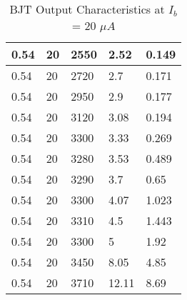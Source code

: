 \documentclass{scrartcl}
\newcommand{\1}{\mathbbm{1}}
\begin{document}
\begin{table}[!ht]
\begin{tabular}{|l|l|l|l|l|}
            0.54 & 20 & 2550 & 2.52 & 0.149 \\ \hline
            0.54 & 20 & 2720 & 2.7 & 0.171 \\ \hline
            0.54 & 20 & 2950 & 2.9 & 0.177 \\ \hline
            0.54 & 20 & 3120 & 3.08 & 0.194 \\ \hline
            0.54 & 20 & 3300 & 3.33 & 0.269 \\ \hline
            0.54 & 20 & 3280 & 3.53 & 0.489 \\ \hline
            0.54 & 20 & 3290 & 3.7 & 0.65 \\ \hline
            0.54 & 20 & 3300 & 4.07 & 1.023 \\ \hline
            0.54 & 20 & 3310 & 4.5 & 1.443 \\ \hline
            0.54 & 20 & 3300 & 5 & 1.92 \\ \hline
            0.54 & 20 & 3450 & 8.05 & 4.85 \\ \hline
            0.54 & 20 & 3710 & 12.11 & 8.69 \\ \hline
        \end{tabular}
        \caption{BJT Output Characteristics at $I_b$ = 20 $\mu A$}
        \label{tab:output20}
    \end{table}
\end{document}
